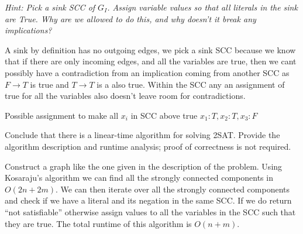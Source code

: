\documentclass[11pt]{article}
\begin{document}
\begin{subparts}
\emph{Hint: Pick a sink SCC of $G_I$. Assign variable values so that all literals in the sink are True. Why are we allowed to do this, and why doesn't it break any implications?}
\begin{solution}
    A sink by definition has no outgoing edges, we pick a sink SCC because we know that if there are only incoming edges, and all the variables are true, then we cant possibly have
    a contradiction from an implication coming from another SCC as $F\rightarrow T$ is true and $T\rightarrow T$ is a also true. Within the SCC any an assignment of true for all the variables also doesn't leave room
    for contradictions. 
    \begin{center}
    \end{center}
    Possible assignment to make all $x_i$ in SCC above true $x_1: T, x_2: T, x_3: F$
\end{solution}
\item Conclude that there is a linear-time algorithm for solving 2SAT. Provide the algorithm description and runtime analysis; proof of correctness is not required.\\
\begin{solution}
    Construct a graph like the one given in the description of the problem. Using Kosaraju's algorithm we can find all the strongly connected components in $O(2n + 2m)$. We can then iterate over all the strongly
    connected components and check if we have a literal and its negation in the same SCC. If we do return ``not satisfiable'' otherwise assign values to all the variables in 
    the SCC such that they are true. The total runtime of this algorithm is $O(n + m)$.
\end{solution}
\end{subparts}
\end{document}
